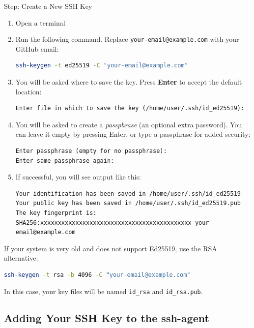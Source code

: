 \documentclass[
    a4paper,
    11pt,
    parskip=half
]{scrartcl}
\begin{document}
\begin{stepbox}{Step: Create a New SSH Key}
\begin{enumerate}
    \item Open a terminal
    \item Run the following command. Replace \texttt{your-email@example.com} with your GitHub email:

\begin{lstlisting}[language=bash]
ssh-keygen -t ed25519 -C "your-email@example.com"
\end{lstlisting}

    \item You will be asked where to save the key. Press \textbf{Enter} to accept the default location:
\begin{lstlisting}
Enter file in which to save the key (/home/user/.ssh/id_ed25519):
\end{lstlisting}

    \item You will be asked to create a \textit{passphrase} (an optional extra password). You can leave it empty by pressing Enter, or type a passphrase for added security:
\begin{lstlisting}
Enter passphrase (empty for no passphrase):
Enter same passphrase again:
\end{lstlisting}

    \item If successful, you will see output like this:
\begin{lstlisting}
Your identification has been saved in /home/user/.ssh/id_ed25519
Your public key has been saved in /home/user/.ssh/id_ed25519.pub
The key fingerprint is:
SHA256:xxxxxxxxxxxxxxxxxxxxxxxxxxxxxxxxxxxxxxxxxxx your-email@example.com
\end{lstlisting}
\end{enumerate}
\end{stepbox}

\begin{notebox}
If your system is very old and does not support Ed25519, use the RSA alternative:
\begin{lstlisting}[language=bash]
ssh-keygen -t rsa -b 4096 -C "your-email@example.com"
\end{lstlisting}
In this case, your key files will be named \texttt{id\_rsa} and \texttt{id\_rsa.pub}.
\end{notebox}

\subsection{Adding Your SSH Key to the ssh-agent}
\label{sec:ssh-agent}
\end{document}
